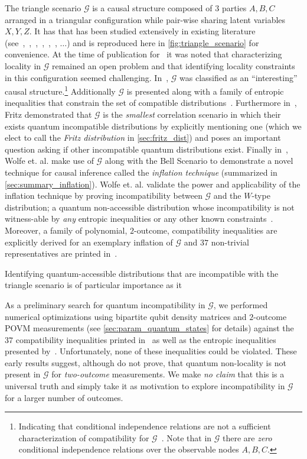 \documentclass[aps, 10pt, english, twoside, pra, nofootinbib, longbibliography]{revtex4-1}
\theoremstyle{plain}
\theoremstyle{definition}
\theoremstyle{remark}
\newcommand{\graph}{\mathcal{G}}
\newcommand{\ts}{{\graph}}
\begin{document}
    The triangle scenario $\ts$ is a causal structure composed of $3$ parties $A, B, C$ arranged in a triangular configuration while pair-wise sharing latent variables $X, Y, Z$. It has that has been studied extensively in existing literature (see~\cite[Fig. 1]{Steudel_2010},~\cite[Fig. 6]{Chaves_2014},~\cite[Fig. 8]{Branciard_2012},~\cite[Fig. 8, Appendix E]{Henson_2014},~\cite[Fig. 3]{Fritz_2012},~\cite[Fig. 1]{Inflation}, $\ldots$) and is reproduced here in \cref{fig:triangle_scenario} for convenience. At the time of publication for~\cite{Branciard_2012} it was noted that characterizing locality in $\ts$ remained an open problem and that identifying locality constraints in this configuration seemed challenging. In~\cite{Henson_2014}, $\ts$ was classified as an ``interesting'' causal structure.\footnote{Indicating that conditional independence relations are not a sufficient characterization of compatibility for $\ts$~\cite{Henson_2014}. Note that in $\ts$ there are \textit{zero} conditional independence relations over the observable nodes $A, B, C$.} Additionally $\ts$ is presented along with a family of entropic inequalities that constrain the set of compatible distributions~\cite{Henson_2014}. Furthermore in~\cite{Fritz_2012}, Fritz demonstrated that $\ts$ is the \textit{smallest} correlation scenario in which their exists quantum incompatible distributions by explicitly mentioning one (which we elect to call the \textit{Fritz distribution} in \cref{sec:fritz_dist}) and poses an important question asking if other incompatible quantum distributions exist. Finally in~\cite{Inflation}, Wolfe et. al. make use of $\ts$ along with the Bell Scenario to demonstrate a novel technique for causal inference called the \textit{inflation technique} (summarized in \cref{sec:summary_inflation}). Wolfe et. al. validate the power and applicability of the inflation technique by proving incompatibility between $\ts$ and the $W$-type distribution; a quantum non-accessible distribution whose incompatibility is not witness-able by \textit{any} entropic inequalities or any other known constraints~\cite{Inflation}. Moreover, a family of polynomial, $2$-outcome, compatibility inequalities are explicitly derived for an exemplary inflation of $\ts$ and $37$ non-trivial representatives are printed in~\cite{Inflation}.

    Identifying quantum-accessible distributions that are incompatible with the triangle scenario is of particular importance as it 

    As a preliminary search for quantum incompatibility in $\ts$, we performed numerical optimizations using bipartite qubit density matrices and $2$-outcome POVM measurements (see \cref{sec:param_quantum_states} for details) against the $37$ compatibility inequalities printed in~\cite{Inflation} as well as the entropic inequalities presented by~\cite{Henson_2014}. Unfortunately, none of these inequalities could be violated. These early results suggest, although do not prove, that quantum non-locality is not present in $\ts$ for \textit{two-outcome} measurements. We make \textit{no claim} that this is a universal truth and simply take it as motivation to explore incompatibility in $\ts$ for a larger number of outcomes.
\end{document}
